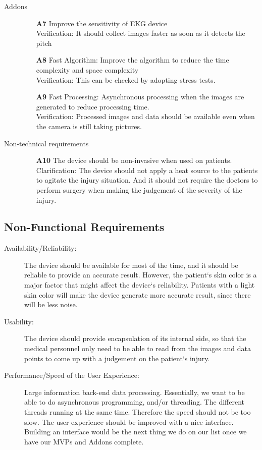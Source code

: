 \documentclass[paper=letter, fontsize=11pt]{scrartcl}
\numberwithin{equation}{section}		%
\numberwithin{figure}{section}			%
\numberwithin{table}{section}			%
\begin{document}
\begin{description}
  \item[Addons] \hspace{1cm}
  	\begin{itemize}
   	\item[\textbf{A7}] Improve the sensitivity of EKG device\\
	\hfill Verification: It should collect images faster as soon as it detects the pitch \\
	\item[\textbf{A8}] Fast Algorithm: Improve the algorithm to reduce the time complexity and space complexity \\
	\hfill Verification: This can be checked by adopting stress tests.
	\item[\textbf{A9}] Fast Processing: Asynchronous processing when the images are generated to reduce processing time.\\
   	\hfill Verification: Processed images and data should be available even when the camera is still taking pictures.
	\end{itemize}
	
  \item[Non-technical requirements]\hspace{1cm}
  	\begin{itemize}
	\item[\textbf{A10}] The device should be non-invasive when used on patients. \\
	\hfill Clarification: The device should not apply a heat source to the patients to agitate the injury situation. And it should not require the doctors to perform surgery when making the judgement of the severity of the injury.
	\end{itemize}
\end{description}

\subsection{Non-Functional Requirements}
 \begin{description}
  	\item[Availability/Reliability:]
	The device should be available for most of the time, and it should be reliable to provide an accurate result. However, the patient`s skin color is a major factor that might affect the device`s reliability. Patients with a light skin color will make the device generate more accurate result, since there will be less noise.
	\item[Usability:]
	The device should provide encapsulation of its internal side, so that the medical personnel only need to be able to read from the images and data points to come up with a judgement on the patient`s injury.
	\item[Performance/Speed of the User Experience:]
	Large information back-end data processing. Essentially, we want to be able to do asynchronous programming, and/or threading. The different threads running at the same time. Therefore the speed should not be too slow. The user experience should be improved with a nice interface. Building an interface would be the next thing we do on our list once we have our MVPs and Addons complete.
\end{description}
\end{document}
